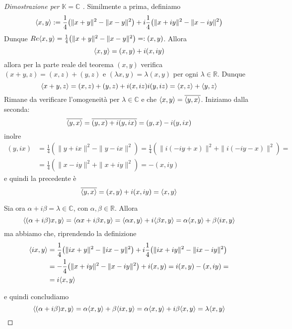 \begin{proof}[Dimostrazione per \(\mathbb{K}=\mathbb{C}\) ]
    Similmente a prima, definiamo 
    \[
      {\left\langle x,y\right\rangle} := \frac{1}{4}{\left( \|x+y\|^2 - \|x-y\|^2  \right)}+ i \frac{1}{4}{\left(  \|x+iy\|^2 - \|x-iy\|^2 \right)} 
    \]
    Dunque \(Re{\left\langle x,y\right\rangle} = \frac{1}{4}{\left( \|x+y\|^2 - \|x-y\|^2 \right)} =: (x,y) \). Allora 
    \[
      {\left\langle x,y\right\rangle} = (x,y) + i (x, iy)
    \]
    allora per la parte reale del teorema \({(x,y)}\) verifica \({(x+y, z)} = {(x,z)}+{(y,z)}\) e \({(\lambda x, y)} = \lambda {(x,y)}\) per ogni \(\lambda \in \mathbb{R}\). Dunque
    \[
      {\left\langle x+y, z\right\rangle}  = {(x,z)} + {(y,z)} + i{(x,iz)} i{(y,iz)} = {\left\langle x,z\right\rangle} + {\left\langle y,z\right\rangle} 
    \]
    Rimane da verificare l'omogeneità per \(\lambda \in \mathbb{C}\) e che \({\left\langle x,y\right\rangle} = \overline{{\left\langle y,x\right\rangle} }\). Iniziamo dalla seconda:
    \[
      \overline{{\left\langle y,x\right\rangle} } = \overline{{(y,x)} + i {(y, ix)}} = {(y,x)} - i {(y, ix)}
    \]
    inolre
    \begin{align*}
        {(y,ix)} &= \frac{1}{4}{\left( \|y + ix\|^2 - \|y -ix\|^2 \right)} = \frac{1}{4}{\left( \|i{(-iy + x)}\|^2 + \|i{(-iy - x)}\|^2 \right)} = \\
                 &= \frac{1}{4}{\left( \|x - iy\|^2 + \|x + iy\|^2 \right)} =
                 -{(x, iy)}
    \end{align*}
    e quindi la precedente è
    \[
      \overline{{\left\langle y,x\right\rangle} } = {(x,y)} + i{(x, iy)} = {\left\langle x,y\right\rangle} 
    \]

    Sia ora \(\alpha + i \beta = \lambda \in \mathbb{C}\), con \(\alpha , \beta \in \mathbb{R}\). Allora
    \[
    {\left\langle{(\alpha + i \beta)}x, y\right\rangle} = {\left\langle\alpha x + i \beta x, y\right\rangle} = {\left\langle \alpha x , y \right\rangle} + i {\left\langle\beta x , y\right\rangle} = \alpha {\left\langle x,y\right\rangle} + \beta {\left\langle ix, y\right\rangle} 
    \]
    ma abbiamo che, riprendendo la definizione
    \begin{align*}
        {\left\langle ix, y\right\rangle} &= \frac{1}{4}{\left( \|ix + y\|^2 - \|ix-y\|^2 \right)} + i
      \frac{1}{4}{\left( \|ix + iy\|^2 - \|ix -iy\|^2 \right)} \\
                     &= -\frac{1}{4}{\left( \|x+iy\|^2 - \|x - iy\|^2 \right)} +
        i {(x,y)} = i{(x,y)} - {(x, iy)} = \\ &= i{\left\langle x,y\right\rangle} 
    \end{align*}

    e quindi concludiamo
    \[
      {\left\langle{(\alpha + i \beta)}x, y\right\rangle} = \alpha{\left\langle x,y\right\rangle} + \beta{\left\langle ix,y\right\rangle} = \alpha{\left\langle x,y\right\rangle} +i \beta{\left\langle x,y\right\rangle} = \lambda{\left\langle x,y\right\rangle} 
    \]
    

\end{proof}

